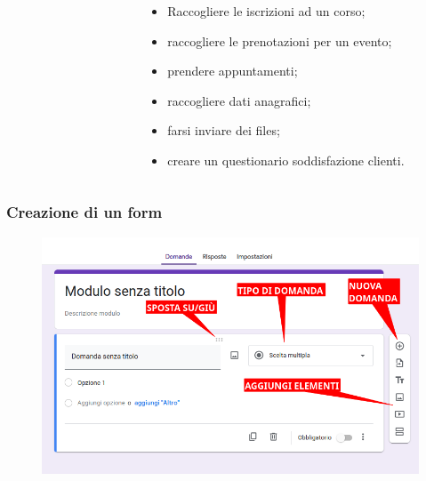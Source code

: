 \documentclass[]{beamer}
\begin{document}
\begin{frame}
\begin{columns}
\begin{column}{.4\textwidth}
\begin{figure}
    \end{figure}
  \end{column}
  \begin{column}{.6\textwidth}
\begin{itemize}
  \item Raccogliere le iscrizioni ad un corso;\pause
  \item raccogliere le prenotazioni per un evento;\pause
  \item prendere appuntamenti;\pause
  \item raccogliere dati anagrafici;\pause
  \item farsi inviare dei files;\pause
  \item creare un questionario soddisfazione clienti.
\end{itemize}
  \end{column}
\end{columns}
\end{frame}




\begin{frame}
\frametitle{Creazione di un form}
\begin{figure}
  \includegraphics[width=\columnwidth]{img/form2.png}
\end{figure}
\end{frame}
\end{document}
